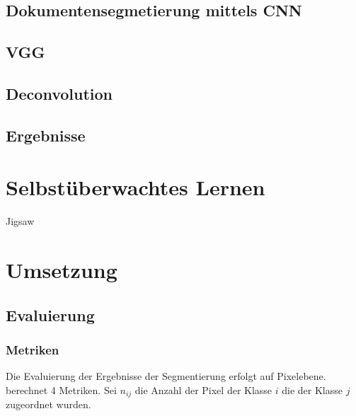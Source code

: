 \section{Dokumentensegmetierung mittels CNN}



\section{\textcite{XuPageSegmentationHistorical2017}}
\section{VGG}
\section{Deconvolution}
\section{Ergebnisse}

\chapter{Selbstüberwachtes Lernen}
\label{chap:selfsupervised}

Jigsaw
\cite{NorooziUnsupervisedLearningVisual2016}
\chapter{Umsetzung}

\section{Evaluierung}


\subsection{Metriken}
Die Evaluierung der Ergebnisse der Segmentierung erfolgt auf Pixelebene.
\cite{LongFullyconvolutionalnetworks2015} berechnet 4 Metriken.
Sei \(n_{ij}\) die Anzahl der Pixel der Klasse \(i\) die der Klasse \(j\) zugeordnet wurden.


